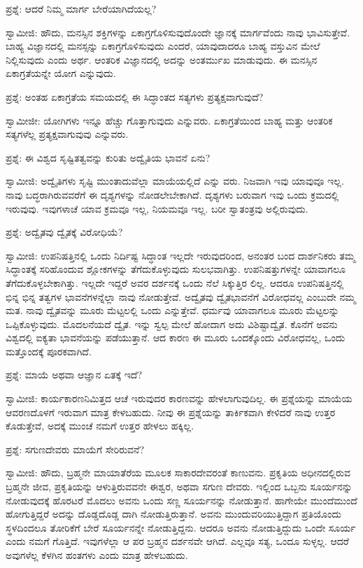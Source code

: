 ಪ್ರಶ್ನೆ: ಆದರೆ ನಿಮ್ಮ ಮಾರ್ಗ ಬೇರೆಯಾಗಿದೆಯಲ್ಲ?

ಸ್ವಾಮೀಜಿ: ಹೌದು, ಮನಸ್ಸಿನ ಶಕ್ತಿಗಳನ್ನು ಏಕಾಗ್ರಗೊಳಿಸುವುದೊಂದೇ ಜ್ಞಾನಕ್ಕೆ ಮಾರ್ಗವೆಂದು ನಾವು ಭಾವಿಸುತ್ತೇವೆ. ಬಾಹ್ಯ ವಿಜ್ಞಾನದಲ್ಲಿ ಮನಸ್ಸನ್ನು ಏಕಾಗ್ರಗೊಳಿಸುವುದು ಎಂದರೆ, ಯಾವುದಾದರೂ ಬಾಹ್ಯ ವಸ್ತುವಿನ ಮೇಲೆ ನಿಲ್ಲಿಸುವುದು ಎಂದು ಅರ್ಥ. ಆಂತರಿಕ ವಿಜ್ಞಾನದಲ್ಲಿ ಅದನ್ನು ಅಂತರ್ಮುಖ ಮಾಡುವುದು. ಈ ಮನಸ್ಸಿನ ಏಕಾಗ್ರತೆಯನ್ನೇ ಯೋಗ ಎನ್ನುವುದು.

ಪ್ರಶ್ನೆ: ಅಂತಹ ಏಕಾಗ್ರತೆಯ ಸಮಯದಲ್ಲಿ ಈ ಸಿದ್ಧಾಂತದ ಸತ್ಯಗಳು ಪ್ರತ್ಯಕ್ಷವಾಗುವುದೆ?

ಸ್ವಾಮೀಜೀ: ಯೋಗಿಗಳು ಇನ್ನೂ ಹೆಚ್ಚು ಗೊತ್ತಾಗುವುದು ಎನ್ನುವರು. ಏಕಾಗ್ರತೆಯಿಂದ ಬಾಹ್ಯ ಮತ್ತು ಆಂತರಿಕ ಸತ್ಯಗಳೆಲ್ಲ ಪ್ರತ್ಯಕ್ಷವಾಗುವುವು ಎನ್ನುವರು.

ಪ್ರಶ್ನೆ: ಈ ವಿಶ್ವದ ಸೃಷ್ಟಿತತ್ವವನ್ನು ಕುರಿತು ಅದ್ವೈತಿಯ ಭಾವನೆ ಏನು?

ಸ್ವಾಮೀಜಿ: ಅದ್ವೈತಿಗಳು ಸೃಷ್ಟಿ ಮುಂತಾದುವೆಲ್ಲಾ ಮಾಯೆಯಲ್ಲಿದೆ ಎನ್ನು ವರು. ನಿಜವಾಗಿ ಇವು ಯಾವುವೂ ಇಲ್ಲ. ನಾವು ಬದ್ಧರಾಗಿರುವವರೆಗೆ ಈ ದೃಶ್ಯಗಳನ್ನು ನೋಡಲೇಬೇಕಾಗಿದೆ. ದೃಶ್ಯಗಳು ಬರುವಾಗ ಇವು ಒಂದು ಕ್ರಮದಲ್ಲಿ ಇರುವುವು. ಇವುಗಳಾಚೆ ಯಾವ ಕ್ರಮವೂ ಇಲ್ಲ, ನಿಯಮವೂ ಇಲ್ಲ. ಬರೀ ಸ್ವಾತಂತ್ರವು ಅಲ್ಲಿರುವುದು.

ಪ್ರಶ್ನೆ: ಅದ್ವೈತವು ದ್ವೈತಕ್ಕೆ ವಿರೋಧಿಯೆ?

ಸ್ವಾಮೀಜಿ: ಉಪನಿಷತ್ತಿನಲ್ಲಿ ಒಂದು ನಿರ್ದಿಷ್ಟ ಸಿದ್ಧಾಂತ ಇಲ್ಲದೇ ಇರುವುದರಿಂದ, ಅನಂತರ ಬಂದ ದಾರ್ಶನಿಕರು ತಮ್ಮ ಸಿದ್ಧಾಂತಕ್ಕೆ ಸರಿಹೊಂದುವ ಶ್ಲೋಕಗಳನ್ನು ತೆಗೆದುಕೊಳ್ಳುವುದು ಸುಲಭವಾಗಿತ್ತು. ಉಪನಿಷತ್ತುಗಳನ್ನೇ ಯಾವಾಗಲೂ ತೆಗೆದುಕೊಳ್ಳಬೇಕಾಗಿತ್ತು. ಇಲ್ಲದೇ ಇದ್ದರೆ ಅವರ ದರ್ಶನಕ್ಕೆ ಒಂದು ನೆಲೆ ಸಿಕ್ಕುತ್ತಿರ ಲಿಲ್ಲ. ಆದರೂ ಉಪನಿಷತ್ತಿನಲ್ಲಿ ಭಿನ್ನ ಭಿನ್ನ ತತ್ವಗಳ ಭಾವನೆಗಳನ್ನೆಲ್ಲಾ ನಾವು ನೋಡುತ್ತೇವೆ. ಅದ್ವೈತವು ದ್ವೈತಭಾವನೆಗೆ ವಿರೋಧವಲ್ಲ ಎಂಬುದೇ ನಮ್ಮ ಮತ. ನಾವು ದ್ವೈತವನ್ನು ಮೂರು ಮೆಟ್ಟಲಲ್ಲಿ ಒಂದು ಎನ್ನುತ್ತೇವೆ. ಧರ್ಮವು ಯಾವಾಗಲೂ ಮೂರು ಮೆಟ್ಟಲನ್ನು ಒಪ್ಪಿಕೊಳ್ಳುವುದು. ಮೊದಲನೆಯದೆ ದ್ವೈತ. ಇನ್ನು ಸ್ವಲ್ಪ ಮೇಲೆ ಹೋದಾಗ ಅದು ವಿಶಿಷ್ಟಾದ್ವೈತ. ಕೊನೆಗೆ ಅವನು ವಿಶ್ವದಲ್ಲಿ ಐಕ್ಯತಾ ಭಾವನೆಯನ್ನು ಪಡೆಯುತ್ತಾನೆ. ಆದ ಕಾರಣ ಈ ಮೂರು ಒಂದಕ್ಕೊಂದು ವಿರೋಧವಲ್ಲ, ಒಂದು ಮತ್ತೊಂದಕ್ಕೆ ಪೂರಕವಾಗಿದೆ.

ಪ್ರಶ್ನೆ: ಮಾಯೆ ಅಥವಾ ಆಜ್ಞಾನ ಏತಕ್ಕೆ ಇದೆ?

ಸ್ವಾಮೀಜಿ: ಕಾರ್ಯಕಾರಣನಿಮಿತ್ತದ ಆಚೆ ಇರುವುದರ ಕಾರಣವನ್ನು ಹೇಳಲಾಗುವುದಿಲ್ಲ. ಈ ಪ್ರಶ್ನೆಯನ್ನು ಮಾಯೆಯ ಆವರಣದೊಳಗೆ ಇರುವಾಗ ಮಾತ್ರ ಕೇಳಬಹುದು. ನೀವು ಈ ಪ್ರಶ್ನೆಯನ್ನು ತಾರ್ಕಿಕವಾಗಿ ಕೇಳಿದರೆ ನಾವು ಉತ್ತರ ಕೊಡುತ್ತೇವೆ, ಅದಕ್ಕೆ ಮುಂಚೆ ನಮಗೆ ಉತ್ತರ ಹೇಳಲು ಹಕ್ಕಿಲ್ಲ.

ಪ್ರಶ್ನೆ: ಸಗುಣದೇವರು ಮಾಯೆಗೆ ಸೇರಿರುವನೆ?

ಸ್ವಾಮೀಜಿ: ಹೌದು, ಬ್ರಹ್ಮನೇ ಮಾಯಾತೆರೆಯ ಮೂಲಕ ಸಾಕಾರದೇವರಂತೆ ಕಾಣುವನು. ಪ್ರಕೃತಿಯ ಅಧೀನದಲ್ಲಿರುವ ಬ್ರಹ್ಮನೇ ಜೀವ, ಪ್ರಕೃತಿಯನ್ನು ಆಳುತ್ತಿರುವವನೇ ಈಶ್ವರ, ಅಥವಾ ಸಗುಣ ದೇವರು. ಇಲ್ಲಿಂದ ಒಬ್ಬನು ಸೂರ್ಯನನ್ನು ನೋಡುವುದಕ್ಕೆ ಹೊರಟರೆ ಮೊದಲು ಅವನು ಒಂದು ಸಣ್ಣ ಸೂರ್ಯನನ್ನು ನೋಡುತ್ತಾನೆ. ಹಾಗೇಯೇ ಮುಂದೆಮುಂದೆ ಹೋಗುತ್ತಿದ್ದರೆ ಅದನ್ನು ದೊಡ್ಡದೊಡ್ಡ ದಾಗಿ ನೋಡುತ್ತಿರುತ್ತಾನೆ. ಅವನು ಮುಂದುವರಿಯುತ್ತಿದ್ದಾಗ ಪ್ರತಿಯೊಂದು ಸ್ಥಳದಿಂದಲೂ ತೋರಿಕೆಗೆ ಬೇರೆ ಸೂರ್ಯನನ್ನೇ ನೋಡುತ್ತಿದ್ದನು. ಆದರೂ ಅವನು ನೋಡುತ್ತಿದ್ದುದು ಒಂದೇ ಸೂರ್ಯ ಎಂದು ನಮಗೆ ಗೊತ್ತಿದೆ. ಇವುಗಳೆಲ್ಲಾ ಆ ಪರ ಬ್ರಹ್ಮನ ದರ್ಶನವೇ ಆಗಿದೆ. ಎಲ್ಲವೂ ಸತ್ಯ, ಒಂದೂ ಸುಳ್ಳಲ್ಲ. ಆದರೆ ಅವುಗಳೆಲ್ಲ ಕೆಳಗಿನ ಹಂತಗಳು ಎಂದು ಮಾತ್ರ ಹೇಳಬಹುದು.

